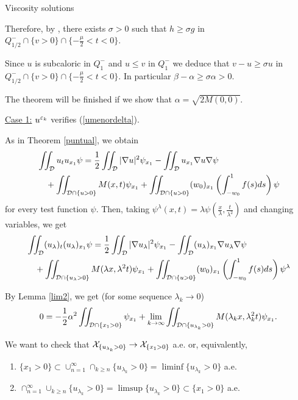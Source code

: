 \begin{section}{Viscosity solutions}
\begin{pf}
Therefore, by \cite{ACS}, there exists $\sigma>0$ such that $h\ge\sigma g$
in $Q_{1/2}^-\cap\{ v>0 \}\cap\{-\frac\mu 2<t<0\}$.

Since $u$ is subcaloric in $Q_1^-$ and $u\le v$ in $Q_1^-$ we deduce that
$v-u\ge\sigma u$ in
$Q_{1/2}^-\cap\{ v>0 \}\cap\{-\frac\mu 2<t<0\}$. In particular
$\beta-\alpha\ge\sigma\alpha>0$.


The theorem will be finished if we show that $\alpha=\sqrt{2M(0,0)}$.

\medskip

\underline{Case 1:} $u^{\varepsilon_k}$ verifies (\ref{umenordelta}).
\medskip

As in Theorem \ref{puntual}, we obtain 
\begin{align*}
&\iint_{\cal D} u_t u_{x_1} \psi = \frac12 \iint_{\cal D} |\nabla u|^2 
\psi_{x_1} - \iint_{\cal D} u_{x_1} \nabla u \nabla \psi \\
&\quad+ 
 \iint_{{\cal D}\cap \{u>0\}}M(x,t) \psi_{x_1}+ \iint_{{\cal D}\cap\{u>0\}}
(w_0)_{x_1}\left(\int_{-w_0}^1f(s)ds\right)\psi
\end{align*}
for every test function $\psi$. Then, taking $\psi^{\lambda}(x,t) = 
\lambda \psi(\frac{x}{\lambda},\frac{t}{\lambda^2})$ and changing variables, 
we get 
\begin{align*}
&\iint_{\cal D} (u_\lambda)_t (u_\lambda)_{x_1} \psi = 
\frac12 \iint_{\cal D} |\nabla u_\lambda|^2 \psi_{x_1} - 
\iint_{\cal D} (u_\lambda)_{x_1} \nabla u_\lambda \nabla \psi \\
&\quad+ \iint_{{\cal D}\cap \{u_\lambda>0\}}M(\lambda x,\lambda^2 t) 
\psi_{x_1} +\iint_{{\cal D}\cap\{u>0\}}(w_0)_{x_1}\left(\int_{-w_0}^1f(s)ds\right)
\psi^\lambda
\end{align*}

By Lemma \ref{lim2}, we get (for some sequence $\lambda_k\to0$)
$$0 = -\frac12 \alpha^2 \iint_{{\cal D}\cap\{x_1>0\}} \psi_{x_1} + 
\lim_{k\to\infty}\iint_{{\cal D}\cap\{u_{\lambda_k}>0\}}M(\lambda_k x,
\lambda_k^2 t)\psi_{x_1}.$$

We want to check that ${\cal X}_{\{ u_{\lambda_k}>0 \}}\to{\cal X}_{\{ x_1>0 \}}$ 
a.e. or, equivalently, 
\begin{enumerate}
\item \label{a}
$\{ x_1>0 \}\subset \cup_{n=1}^{\infty}\cap_{k\ge n}\{ u_{\lambda_k}>0 \} 
= \liminf \{ u_{\lambda_k}>0 \}$ a.e.
\item \label{b}
$\cap_{n=1}^{\infty}\cup_{k\ge n}\{ u_{\lambda_k}>0 \} = 
\limsup \{ u_{\lambda_k}>0 \} \subset \{ x_1>0 \}$ a.e.
\end{enumerate}



\end{pf}
\end{section}
